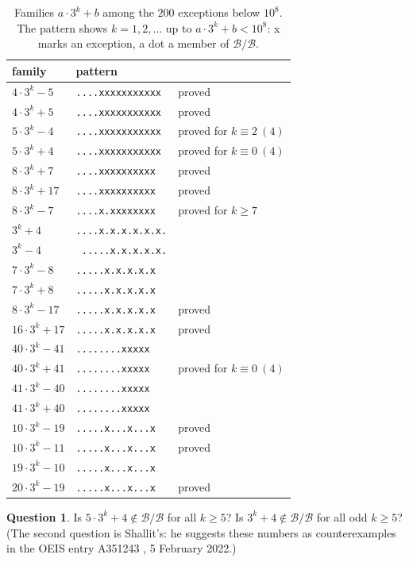 \documentclass[11pt]{amsart}
\theoremstyle{definition}
\newtheorem{question}[theorem]{Question}
\newcommand{\B}{\mathcal{B}}
\begin{document}
\begin{table}[htbp]\centering\small
\caption{Families $a\cdot 3^k+b$ among the $200$ exceptions below $10^8$. The pattern shows $k=1,2,\dots$
up to $a\cdot 3^k+b<10^8$: x marks an exception, a dot a member of $\B/\B$.}
\label{tab:fam}
\begin{tabular}{lll}\toprule
family & pattern & \\ \midrule
$4\cdot 3^k-5$ & \texttt{....xxxxxxxxxxx} & proved \\
$4\cdot 3^k+5$ & \texttt{....xxxxxxxxxxx} & proved \\
$5\cdot 3^k-4$ & \texttt{....xxxxxxxxxxx} & proved for $k\equiv 2\ (4)$ \\
$5\cdot 3^k+4$ & \texttt{....xxxxxxxxxxx} & proved for $k\equiv 0\ (4)$ \\
$8\cdot 3^k+7$ & \texttt{....xxxxxxxxxx} & proved \\
$8\cdot 3^k+17$ & \texttt{....xxxxxxxxxx} & proved \\
$8\cdot 3^k-7$ & \texttt{....x.xxxxxxxx} & proved for $k\ge 7$ \\
$3^k+4$ & \texttt{....x.x.x.x.x.x.} &  \\
$3^k-4$ & \texttt{~.....x.x.x.x.x.} &  \\
$7\cdot 3^k-8$ & \texttt{.....x.x.x.x.x} &  \\
$7\cdot 3^k+8$ & \texttt{.....x.x.x.x.x} &  \\
$8\cdot 3^k-17$ & \texttt{.....x.x.x.x.x} & proved \\
$16\cdot 3^k+17$ & \texttt{.....x.x.x.x.x} & proved \\
$40\cdot 3^k-41$ & \texttt{........xxxxx} &  \\
$40\cdot 3^k+41$ & \texttt{........xxxxx} & proved for $k\equiv 0\ (4)$ \\
$41\cdot 3^k-40$ & \texttt{........xxxxx} &  \\
$41\cdot 3^k+40$ & \texttt{........xxxxx} &  \\
$10\cdot 3^k-19$ & \texttt{.....x...x...x} & proved \\
$10\cdot 3^k-11$ & \texttt{.....x...x...x} & proved \\
$19\cdot 3^k-10$ & \texttt{.....x...x...x} &  \\
$20\cdot 3^k-19$ & \texttt{.....x...x...x} & proved \\
\bottomrule\end{tabular}\end{table}

\begin{question}\label{q:five}
Is $5\cdot 3^k+4\notin\B/\B$ for all $k\ge 5$? Is $3^k+4\notin\B/\B$ for all odd $k\ge 5$? (The second
question is Shallit's: he suggests these numbers as counterexamples in the OEIS entry A351243
\cite{OEIS}, 5 February 2022.)
\end{question}
\end{document}
